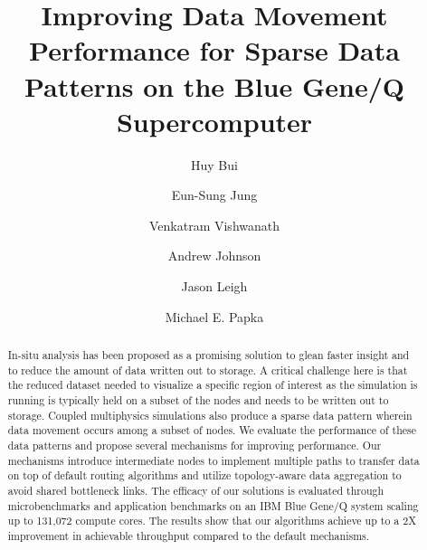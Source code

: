 \documentclass[final,5p,times]{elsarticle}
\begin{document}
\begin{frontmatter}



\title{Improving Data Movement Performance for Sparse Data Patterns on the Blue Gene/Q Supercomputer}


\author[evl]{Huy Bui}
\author[mcs]{Eun-Sung Jung}
\author[mcs]{Venkatram Vishwanath}
\author[evl]{Andrew Johnson}
\author[evl]{Jason Leigh}
\author[alcf,niu]{Michael E. Papka}

\address[evl]{Electronic Visualization Laboratory (EVL), University of Illinois at Chicago, 842 W Taylor St, Chicago, IL 60607, USA}
\address[mcs]{Mathematics and Computer Science, Argonne National Laboratory, 9700 S Cass Ave, Lemont, IL 60439, USA}
\address[alcf]{Argonne Leadership Computing Facility, Argonne National Laboratory, 9700 S Cass Ave, Lemont, IL 60439, IL, USA}
\address[niu]{Northern Illinois University, 300 Normal Road, DeKalb, IL 60115, USA}

\begin{abstract}

In-situ analysis has been proposed as a promising solution to glean faster insight and to reduce the amount of data written out to storage. A critical challenge here is that the reduced dataset needed to visualize a specific region of interest as the simulation is running is typically held on a subset of the nodes and needs to be written out to storage. Coupled multiphysics simulations also produce a sparse data pattern wherein data movement occurs among a subset of nodes. We evaluate the performance of these data patterns and propose several mechanisms for improving performance. Our mechanisms introduce intermediate nodes to implement multiple paths to transfer data on top of default routing algorithms and utilize topology-aware data aggregation to avoid shared bottleneck links. The efficacy of our solutions is evaluated through microbenchmarks and application benchmarks on an IBM Blue Gene/Q system scaling up to 131,072 compute cores. The results show that our algorithms achieve up to a 2X improvement in achievable throughput compared to the default mechanisms.


\end{abstract}
\end{frontmatter}
\end{document}
